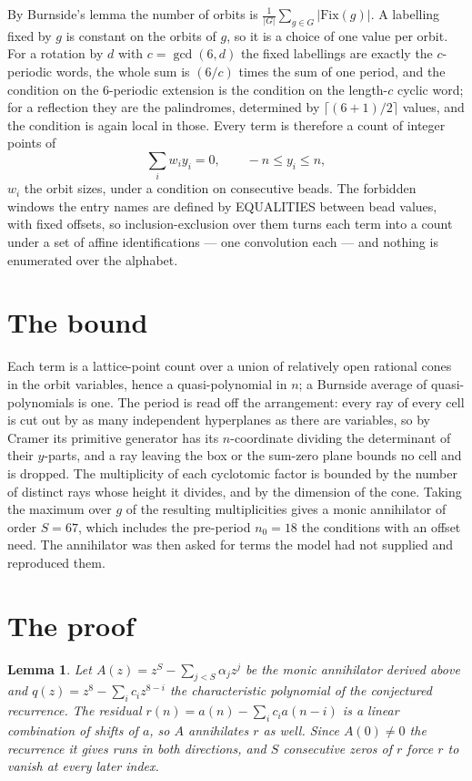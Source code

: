 \documentclass[11pt,a4paper]{article}
\theoremstyle{plain}
\newtheorem{lemma}[theorem]{Lemma}
\theoremstyle{definition}
\begin{document}
By Burnside's lemma the number of orbits is $\frac{1}{|G|}\sum_{g\in G}|\mathrm{Fix}(g)|$.
A labelling fixed by $g$ is constant on the orbits of $g$, so it is a choice of one value per
orbit. For a rotation by $d$ with $c=\gcd(6,d)$ the fixed labellings are exactly the
$c$-periodic words, the whole sum is $(6/c)$ times the sum of one period, and the condition on
the $6$-periodic extension is the condition on the length-$c$ cyclic word; for a reflection
they are the palindromes, determined by $\lceil(6+1)/2\rceil$ values, and the condition is
again local in those. Every term is therefore a count of integer points of
\[
\sum_i w_i y_i = 0, \qquad -n \le y_i \le n,
\]
$w_i$ the orbit sizes, under a condition on consecutive beads. The forbidden windows the entry
names are defined by EQUALITIES between bead values, with fixed offsets, so inclusion-exclusion
over them turns each term into a count under a set of affine identifications --- one
convolution each --- and nothing is enumerated over the alphabet.

\section{The bound}

Each term is a lattice-point count over a union of relatively open rational cones in the orbit
variables, hence a quasi-polynomial in $n$; a Burnside average of quasi-polynomials is one. The
period is read off the arrangement: every ray of every cell is cut out by as many independent
hyperplanes as there are variables, so by Cramer its primitive generator has its $n$-coordinate
dividing the determinant of their $y$-parts, and a ray leaving the box or the sum-zero plane
bounds no cell and is dropped. The multiplicity of each cyclotomic factor is bounded by the
number of distinct rays whose height it divides, and by the dimension of the cone. Taking the
maximum over $g$ of the resulting multiplicities gives a monic annihilator of order
$S=67$, which includes the pre-period $n_0=18$ the conditions with an offset need. The
annihilator was then asked for terms the model had not supplied and reproduced them.

\section{The proof}

\begin{lemma}\label{lem:crit}
Let $A(z)=z^S-\sum_{j<S}\alpha_jz^{j}$ be the monic annihilator derived above and
$q(z)=z^{8}-\sum_ic_iz^{8-i}$ the characteristic polynomial of the conjectured
recurrence. The residual $r(n)=a(n)-\sum_ic_ia(n-i)$ is a linear combination of shifts of $a$,
so $A$ annihilates $r$ as well. Since $A(0)\ne0$ the recurrence it gives runs in both
directions, and $S$ consecutive zeros of $r$ force $r$ to vanish at every later index.
\end{lemma}
\end{document}
